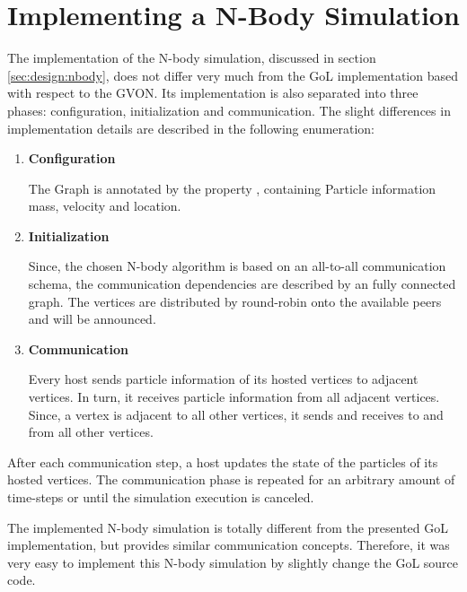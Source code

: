 \section{Implementing a N-Body Simulation}
\label{sec:impl:nbody}


The implementation of the N-body simulation, discussed in section
\ref{sec:design:nbody}, does not differ very much from the GoL
implementation based with respect to the GVON. Its implementation is
also separated into three phases: configuration, initialization and
communication. The slight differences in implementation details are
described in the following enumeration:

\begin{enumerate}
\item \textbf{Configuration}

  The Graph is annotated by the property
  , containing Particle information mass, velocity and
  location.

\item \textbf{Initialization}

  Since, the chosen N-body algorithm is
  based on an all-to-all communication schema, the communication
  dependencies are described by an fully connected graph. The vertices
  are distributed by round-robin onto the available peers and will be
  announced.

\item \textbf{Communication}

  Every host sends particle information
  of its hosted vertices to adjacent vertices. In turn, it receives
  particle information from all adjacent vertices. Since, a vertex is
  adjacent to all other vertices, it sends and receives to and from
  all other vertices.
\end{enumerate}

\noindent After each communication step, a host updates the state of the
particles of its hosted vertices.  The communication phase is repeated
for an arbitrary amount of time-steps or until the simulation
execution is canceled.

The implemented N-body simulation is totally different from the
presented GoL implementation, but provides similar communication
concepts. Therefore, it was very easy to implement this N-body
simulation by slightly change the GoL source code.


